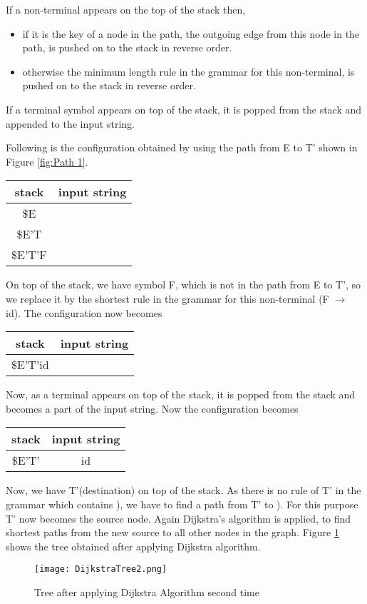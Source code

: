 \begin{example}
If a non-terminal appears on the top of the stack then,
\begin{itemize}
\item if it is the key of a node in the path, the outgoing edge from this node in the path, is pushed on to the stack in reverse order.
\item otherwise the minimum length rule in the grammar for this non-terminal, is pushed on to the stack in reverse order.
\end{itemize}
If a terminal symbol appears on top of the stack, it is popped from the stack and appended to the input string.

Following is the configuration obtained by using the path from E to T' shown in Figure \ref{fig:Path 1}.
\begin{center}
\begin{tabular}{ |c|c| } 
 \hline
 \textbf{stack} & \textbf{input string} \\
 \hline
 \$E & \\
 \$E'T & \\
 \$E'T'F & \\
 \hline
\end{tabular}
\end{center}

On top of the stack, we have symbol F, which is not in the path from E to T', so we replace it by the shortest rule in the grammar for this non-terminal (F $\to$ id). The configuration now becomes
\begin{center}
\begin{tabular}{ |c|c| } 
 \hline
 \textbf{stack} & \textbf{input string} \\
 \hline
 \$E'T'id & \\
 \hline
\end{tabular}
\end{center}

Now, as a terminal appears on top of the stack, it is popped from the stack and becomes a part of the input string. Now the configuration becomes
\begin{center}
\begin{tabular}{ |c|c| } 
 \hline
 \textbf{stack} & \textbf{input string} \\
 \hline
 \$E'T' & id \\
 \hline
\end{tabular}
\end{center}

Now, we have T'(destination) on top of the stack. As there is no rule of T' in the grammar which contains ), we have to find a path from T' to ). For this purpose T' now becomes the source node. Again Dijkstra's algorithm is applied, to find shortest paths from the new source to all other nodes in the graph. Figure \ref{fig:Dijkstra Tree 2} shows the tree obtained after applying Dijkstra algorithm.
\begin{figure}
\centering
\texttt{[image: DijkstraTree2.png]}
\caption{Tree after applying Dijkstra Algorithm second time}
\label{fig:Dijkstra Tree 2}
\end{figure}


\end{example}
